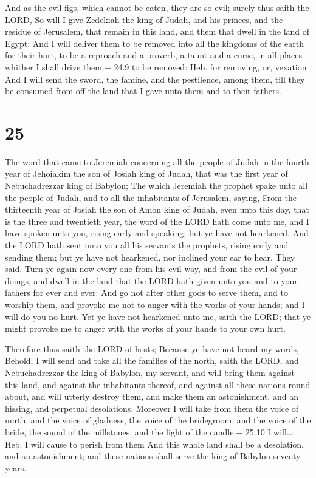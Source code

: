  And as the evil figs, which cannot be eaten, they are so
evil; surely thus saith the LORD, So will I give Zedekiah the king of
Judah, and his princes, and the residue of Jerusalem, that remain in
this land, and them that dwell in the land of Egypt:  And I
will deliver them to be removed into all the kingdoms of the earth for
their hurt, to be a reproach and a proverb, a taunt and a curse, in all
places whither I shall drive them.+ 24.9 to be removed: Heb. for
removing, or, vexation  And I will send the sword, the
famine, and the pestilence, among them, till they be consumed from off
the land that I gave unto them and to their fathers.

\hypertarget{section-24}{%
\section{25}\label{section-24}}

 The word that came to Jeremiah concerning all the people of
Judah in the fourth year of Jehoiakim the son of Josiah king of Judah,
that was the first year of Nebuchadrezzar king of Babylon; 
The which Jeremiah the prophet spake unto all the people of Judah, and
to all the inhabitants of Jerusalem, saying,  From the
thirteenth year of Josiah the son of Amon king of Judah, even unto this
day, that is the three and twentieth year, the word of the LORD hath
come unto me, and I have spoken unto you, rising early and speaking; but
ye have not hearkened.  And the LORD hath sent unto you all
his servants the prophets, rising early and sending them; but ye have
not hearkened, nor inclined your ear to hear.  They said,
Turn ye again now every one from his evil way, and from the evil of your
doings, and dwell in the land that the LORD hath given unto you and to
your fathers for ever and ever:  And go not after other gods
to serve them, and to worship them, and provoke me not to anger with the
works of your hands; and I will do you no hurt.  Yet ye have
not hearkened unto me, saith the LORD; that ye might provoke me to anger
with the works of your hands to your own hurt.

 Therefore thus saith the LORD of hosts; Because ye have
not heard my words,  Behold, I will send and take all the
families of the north, saith the LORD, and Nebuchadrezzar the king of
Babylon, my servant, and will bring them against this land, and against
the inhabitants thereof, and against all these nations round about, and
will utterly destroy them, and make them an astonishment, and an
hissing, and perpetual desolations.  Moreover I will take
from them the voice of mirth, and the voice of gladness, the voice of
the bridegroom, and the voice of the bride, the sound of the millstones,
and the light of the candle.+ 25.10 I will\ldots: Heb. I will cause to
perish from them  And this whole land shall be a
desolation, and an astonishment; and these nations shall serve the king
of Babylon seventy years.

